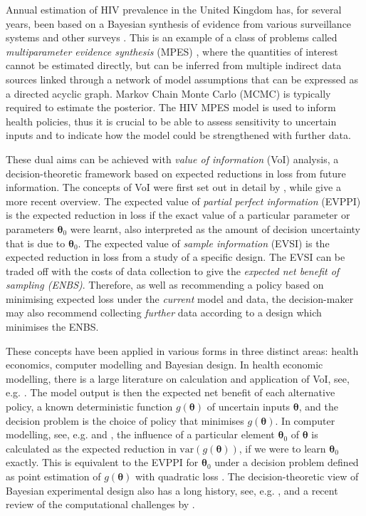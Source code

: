 \documentclass[12pt]{article}\usepackage[]{graphicx}\usepackage[]{color}
\newcommand{\var}{\mbox{var}}
\begin{document}
Annual estimation of HIV prevalence in the United Kingdom has, for several years, been based on a Bayesian synthesis of evidence from various surveillance systems and other surveys \citep{goubar2008estimates,Presanis2010,DeAngelis2014a,PHEreport2016}.  This is an example of a class of problems called \emph{multiparameter evidence synthesis} (MPES) \citep[e.g.][]{ades:sutton}, where the quantities of interest cannot be estimated directly, but can be inferred from multiple indirect data sources linked through a network of model assumptions that can be expressed as a directed acyclic graph.   Markov Chain Monte Carlo (MCMC) is typically required to estimate the posterior. The HIV MPES model is used to inform health policies, thus it is crucial to be able to assess sensitivity to uncertain inputs and to indicate how the model could be strengthened with further data. 

These dual aims can be achieved with \emph{value of information} (VoI) analysis, a decision-theoretic framework based on expected reductions in loss from future information.  The concepts of VoI were first set out in detail by \citet{raiffa:schlaifer}, while \citet{parmigiani2009decision} give a more recent overview.   The expected value of \emph{partial perfect information} (EVPPI) is the expected reduction in loss if the exact value of a particular parameter or parameters $\bm\theta_0$ were learnt, also interpreted as the amount of decision uncertainty that is due to $\bm\theta_0$.  The expected value of \emph{sample information} (EVSI) is the expected reduction in loss from a study of a specific design.  
The EVSI can be traded off with the costs of data collection to give the \emph{expected net benefit of sampling (ENBS)}.  Therefore, as well as recommending a policy based on minimising expected loss under the \emph{current} model and data, the decision-maker may also recommend collecting \emph{further} data according to a design which minimises the ENBS.

These concepts have been applied in various forms in three distinct areas: health economics, computer modelling and Bayesian design.  In health economic modelling, there is a large literature on calculation and application of VoI, see, e.g. \citet{felli1998sensitivity,willan2005value,claxton2006using,welton2008research}.  The model output is then the expected net benefit of each alternative policy, a known deterministic function $g(\bm\theta)$ of uncertain inputs $\bm\theta$, and the decision problem is the choice of policy that minimises $g(\bm\theta)$.  In computer modelling, see, e.g. \citet{oakley:ohagan:psa} and \citet{saltelli2004sensitivity}, the influence of a particular element $\bm\theta_0$ of $\bm\theta$ is calculated as the expected reduction in $\var(g(\bm\theta))$, if we were to learn $\bm\theta_0$ exactly.  This is equivalent to the EVPPI for $\bm\theta_0$ under a decision problem defined as point estimation of $g(\bm\theta)$ with quadratic loss \citep{oakley:ohagan:psa}.   The decision-theoretic view of Bayesian experimental design also has a long history, see, e.g. \citet{lindley1956measure,bernardo:smith,chaloner1995bayesian,berger2013statistical}, and a recent review of the computational challenges by \citet{ryan2015review}. 
\end{document}

